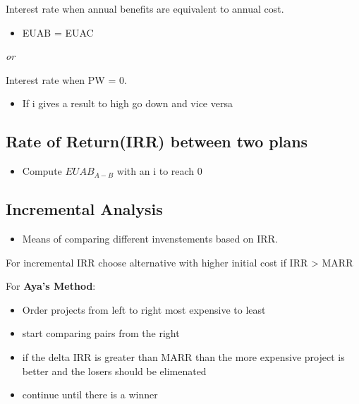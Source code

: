 \documentclass[]{article}
\providecommand{\tightlist}{%
  \setlength{\itemsep}{0pt}\setlength{\parskip}{0pt}}
\begin{document}
Interest rate when annual benefits are equivalent to annual cost.

\begin{itemize}
\tightlist
\item
  EUAB = EUAC
\end{itemize}

\emph{or}

Interest rate when PW = 0.

\begin{itemize}
\tightlist
\item
  If i gives a result to high go down and vice versa
\end{itemize}

\hypertarget{rate-of-returnirr-between-two-plans}{%
\subsection{Rate of Return(IRR) between two
plans}\label{rate-of-returnirr-between-two-plans}}

\begin{itemize}
\tightlist
\item
  Compute \(EUAB_{A-B}\) with an i to reach 0
\end{itemize}

\hypertarget{incremental-analysis}{%
\subsection{Incremental Analysis}\label{incremental-analysis}}

\begin{itemize}
\tightlist
\item
  Means of comparing different invenstements based on IRR.
\end{itemize}

For incremental IRR choose alternative with higher initial cost if IRR
\textgreater{} MARR

For \textbf{Aya's Method}:

\begin{itemize}
\tightlist
\item
  Order projects from left to right most expensive to least
\item
  start comparing pairs from the right
\item
  if the delta IRR is greater than MARR than the more expensive project
  is better and the losers should be elimenated
\item
  continue until there is a winner
\end{itemize}
\end{document}

